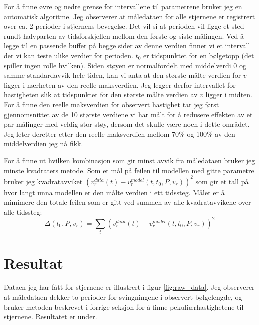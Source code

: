 \documentclass[english,notitlepage]{revtex4-1}  %
\begin{document}
For å finne øvre og nedre grense for intervallene til parametrene bruker jeg en
 automatisk algoritme. Jeg observerer at måledataen for alle stjernene er registrert over ca. 2 perioder i stjernens bevegelse. Det vil si at perioden vil ligge et sted rundt halvparten av tidsforskjellen mellom den første og siste målingen. Ved å legge til en passende buffer på begge sider av denne verdien finner vi et intervall der vi kan teste ulike verdier for perioden. $t_0$ er tidspunktet for en bølgetopp (det spiller ingen rolle hvilken). Siden støyen er normalfordelt med middelverdi 0 og samme standardavvik hele tiden, kan vi anta at den største målte verdien for $v$ ligger i nærheten av den reelle maksverdien. Jeg legger derfor intervallet for hastigheten slik at tidspunktet for den største målte verdien av $v$ ligger i midten. For å finne den reelle maksverdien for observert hastighet tar jeg først gjennomsnittet av de 10 største verdiene vi har målt for å redusere effekten av et par målinger med veldig stor støy, dersom det skulle være noen i dette området. Jeg leter deretter etter den reelle maksverdien mellom 70\% og 100\% av den middelverdien jeg nå fikk.

For å finne ut hvilken kombinasjon som gir minst avvik fra måledataen bruker jeg minste
 kvadraters metode. Som et mål på feilen til modellen med gitte parametre bruker jeg kvadratavviket $(v_r^{data} (t) - v_r^{model} (t, t_0, P, v_r))^2$ som gir et tall på hvor langt unna modellen er den målte verdien i ett tidssteg. Målet er å mimimere den totale feilen som er gitt ved summen av alle kvadratavvikene over alle tidssteg:
 \begin{equation}
   \label{eq:error}
   \Delta (t_0, P, v_r) = \sum_t (v_r^{data} (t) - v_r^{model} (t, t_0, P, v_r))^2
 \end{equation}




\section{Resultat}

Dataen jeg har fått for stjernene er illustrert i figur \ref{fig:raw_data}. Jeg
 observerer at måledataen dekker to perioder for svingningene i observert bølgelengde, og bruker metoden beskrevet i forrige seksjon for å finne pekuliærhastighetene til stjernene. Resultatet er under.

\end{document}

